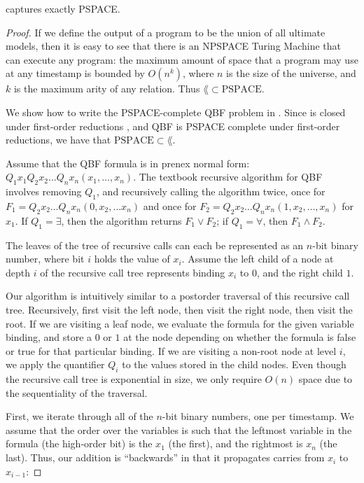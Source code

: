 \begin{lemma}
\label{lem:lang-pspace}
\lang captures exactly PSPACE.
\end{lemma}
\begin{proof}
If we define the output of a \lang program to be the union of all ultimate models, then it is easy to see that there is an NPSPACE Turing Machine that can execute any \lang program: the maximum amount of space that a \lang program may use at any timestamp is bounded by $O(n^k)$, where $n$ is the size of the universe, and $k$ is the maximum arity of any relation.  Thus $\lang \subset \text{PSPACE}$.

We show how to write the PSPACE-complete QBF problem in \lang. Since \lang is closed under first-order reductions , and QBF is PSPACE complete under first-order reductions, we have that $\text{PSPACE} \subset \lang$.

Assume that the QBF formula is in prenex normal form: $Q_1 x_1 Q_2 x_2 \ldots Q_n x_n(x_1, \ldots, x_n)$.  The textbook recursive algorithm for QBF  involves removing $Q_1$, and recursively calling the algorithm twice, once for $F_1 = Q_2 x_2 \ldots Q_n x_n(0, x_2, \ldots x_n)$ and once for $F_2 = Q_2 x_2 \ldots Q_n x_n(1, x_2, \ldots, x_n)$ for $x_1$.  If $Q_1 = \exists$, then the algorithm returns $F_1 \lor F_2$; if $Q_1 = \forall$, then $F_1 \land F_2$.

The leaves of the tree of recursive calls can each be represented as an $n$-bit binary number, where bit $i$ holds the value of $x_i$.  Assume the left child of a node at depth $i$ of the recursive call tree represents binding $x_{i}$ to $0$, and the right child $1$.

Our algorithm is intuitively similar to a postorder traversal of this recursive call tree.  Recursively, first visit the left node, then visit the right node, then visit the root.  If we are visiting a leaf node, we evaluate the formula for the given variable binding, and store a $0$ or $1$ at the node depending on whether the formula is false or true for that particular binding.  If we are visiting a non-root node at level $i$, we apply the quantifier $Q_i$ to the values stored in the child nodes.  Even though the recursive call tree is exponential in size, we only require $O(n)$ space due to the sequentiality of the traversal.

First, we iterate through all of the $n$-bit binary numbers, one per timestamp.  We assume that the order over the variables is such that the leftmost variable in the formula (the high-order bit) is the $x_1$ (the first), and the rightmost is $x_n$ (the last).  Thus, our addition is ``backwards'' in that it propagates carries from $x_i$ to $x_{i-1}$:


\end{proof}
